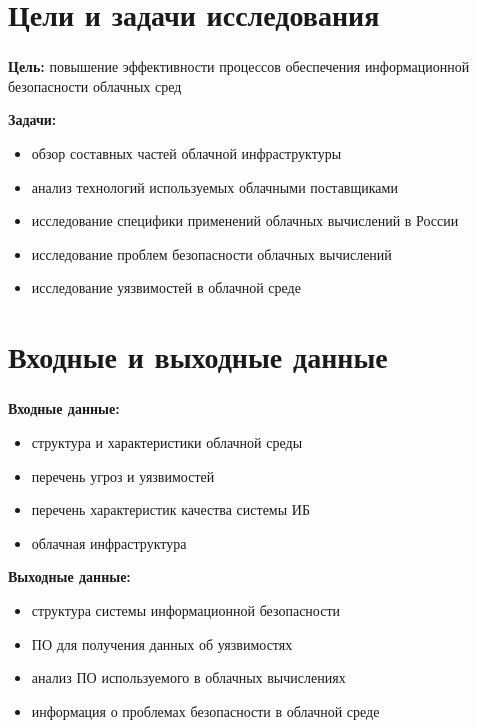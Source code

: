 
\frame[plain]{\titlepage} %


\section{Цели и задачи исследования}

\begin{frame}
\frametitle{\insertsection}

\textbf{Цель:} повышение эффективности процессов обеспечения информационной безопасности облачных сред

\vspace{\baselineskip}

\textbf{Задачи:}
\begin{itemize}
    \item обзор составных частей облачной инфраструктуры
    \item анализ технологий используемых облачными поставщиками
    \item исследование специфики применений облачных вычислений в России
    \item исследование проблем безопасности облачных вычислений
    \item исследование уязвимостей в облачной среде
\end{itemize}
\end{frame}


\section{Входные и выходные данные}

\begin{frame}
\frametitle{\insertsection}

\textbf{Входные данные:}
\begin{itemize}
    \item структура и характеристики облачной среды
    \item перечень угроз и уязвимостей
    \item перечень характеристик качества системы ИБ
    \item облачная инфраструктура
\end{itemize}

\vspace{\baselineskip}

\textbf{Выходные данные:}
\begin{itemize}
    \item структура системы информационной безопасности
    \item ПО для получения данных об уязвимостях
    \item анализ ПО используемого в облачных вычислениях
    \item информация о проблемах безопасности в облачной среде
\end{itemize}
\end{frame}

